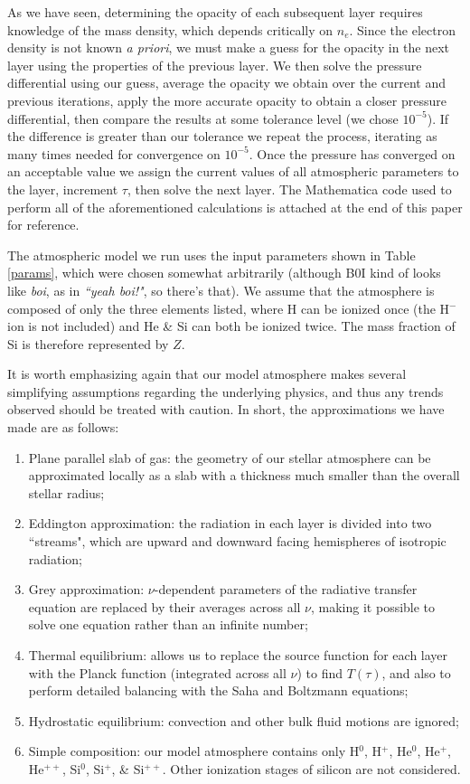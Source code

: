\documentclass[iop,revtex4]{emulateapj}
\begin{document}
As we have seen, determining the opacity of each subsequent layer requires knowledge of the mass density, which depends critically on $n_{e}$. Since the electron density is not known \textit{a priori}, we must make a guess for the opacity in the next layer using the properties of the previous layer. We then solve the pressure differential using our guess, average the opacity we obtain over the current and previous iterations, apply the more accurate opacity to obtain a closer pressure differential, then compare the results at some tolerance level (we chose $10^{-5}$). If the difference is greater than our tolerance we repeat the process, iterating as many times needed for convergence on $10^{-5}$. Once the pressure has converged on an acceptable value we assign the current values of all atmospheric parameters to the layer, increment $\tau$, then solve the next layer. The Mathematica code used to perform all of the aforementioned calculations is attached at the end of this paper for reference.
\par
The atmospheric model we run uses the input parameters shown in Table \ref{params}, which were chosen somewhat arbitrarily (although B0I kind of looks like \textit{boi}, as in \textit{``yeah boi!"}, so there's that). We assume that the atmosphere is composed of only the three elements listed, where H can be ionized once (the H$^{-}$ ion is not included) and He \& Si can both be ionized twice. The mass fraction of Si is therefore represented by $Z$.
\par
It is worth emphasizing again that our model atmosphere makes several simplifying assumptions regarding the underlying physics, and thus any trends observed should be treated with caution. In short, the approximations we have made are as follows:
\begin{enumerate}
\item Plane parallel slab of gas: the geometry of our stellar atmosphere can be approximated locally as a slab with a thickness much smaller than the overall stellar radius;
\item Eddington approximation: the radiation in each layer is divided into two ``streams", which are upward and downward facing hemispheres of isotropic radiation;
\item Grey approximation: $\nu$-dependent parameters of the radiative transfer equation are replaced by their averages across all $\nu$, making it possible to solve one equation rather than an infinite number;
\item Thermal equilibrium: allows us to replace the source function for each layer with the Planck function (integrated across all $\nu$) to find $T(\tau)$, and also to perform detailed balancing with the Saha and Boltzmann equations;
\item Hydrostatic equilibrium: convection and other bulk fluid motions are ignored;
\item Simple composition: our model atmosphere contains only H$^{0}$, H$^{+}$, He$^{0}$, He$^{+}$, He$^{++}$, Si$^{0}$, Si$^{+}$, \& Si$^{++}$. Other ionization stages of silicon are not considered.
\end{enumerate}
\vspace{0.5cm}
\end{document}
